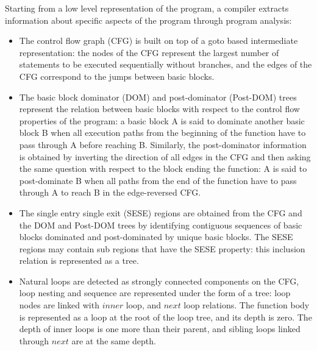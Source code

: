 \documentclass{sigplanconf}
\begin{document}
Starting from a low level representation of the program, a compiler extracts
information about specific aspects of the program through program analysis:

\begin{itemize}
\item The control flow graph (CFG) \cite{dragonbook} is built on top of a goto
  based intermediate representation: the nodes of the CFG represent the largest
  number of statements to be executed sequentially without branches, and the
  edges of the CFG correspond to the jumps between basic blocks.

\item The basic block dominator (DOM) and post-dominator (Post-DOM) trees
  \cite{dragonbook} represent the relation between basic blocks with respect to
  the control flow properties of the program: a basic block A is said to
  dominate another basic block B when all execution paths from the beginning of
  the function have to pass through A before reaching B.  Similarly, the
  post-dominator information is obtained by inverting the direction of all edges
  in the CFG and then asking the same question with respect to the block ending
  the function: A is said to post-dominate B when all paths from the end of the
  function have to pass through A to reach B in the edge-reversed CFG.

\item The single entry single exit (SESE) regions \cite{sese} are
  obtained from the CFG and the DOM and Post-DOM trees by identifying contiguous
  sequences of basic blocks dominated and post-dominated by unique basic blocks.
  The SESE regions may contain sub regions that have the SESE property: this
  inclusion relation is represented as a tree.

\item Natural loops \cite{dragonbook} are detected as strongly connected
  components \cite{tarjan} on the CFG, loop nesting and sequence are represented
  under the form of a tree: loop nodes are linked with $inner$ loop, and $next$
  loop relations.  The function body is represented as a loop at the root of the
  loop tree, and its depth is zero.  The depth of inner loops is one more than
  their parent, and sibling loops linked through $next$ are at the same depth.



\end{itemize}
\end{document}
